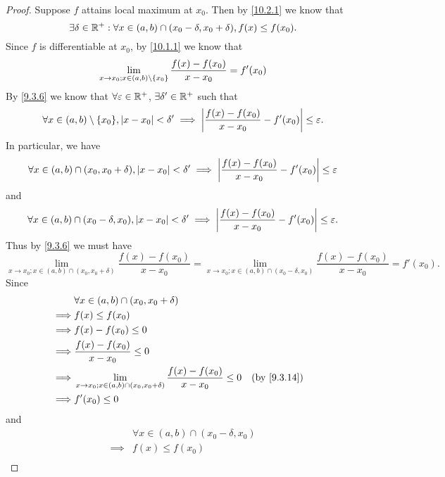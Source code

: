 \begin{proof}
  Suppose \(f\) attains local maximum at \(x_0\).
  Then by \cref{10.2.1} we know that
  \[
    \exists \delta \in \mathbb{R}^+ : \forall x \in (a, b) \cap (x_0 - \delta, x_0 + \delta), f(x) \leq f(x_0).
  \]
  Since \(f\) is differentiable at \(x_0\), by \cref{10.1.1} we know that
  \[
    \lim_{x \to x_0 ; x \in (a, b) \setminus \left\lbrace x_0\right\rbrace} \dfrac{f(x) - f(x_0)}{x - x_0} = f'(x_0)
  \]
  By \cref{9.3.6} we know that \(\forall \varepsilon \in \mathbb{R}^+\), \(\exists \delta' \in \mathbb{R}^+\) such that
  \[
    \forall x \in (a, b) \setminus \set{x_0}, \abs{x - x_0} < \delta' \implies \abs{\dfrac{f(x) - f(x_0)}{x - x_0} - f'(x_0)} \leq \varepsilon.
  \]
  In particular, we have
  \[
    \forall x \in (a, b) \cap (x_0, x_0 + \delta), \left\lvert x - x_0\right\rvert < \delta' \implies \left\lvert\dfrac{f(x) - f(x_0)}{x - x_0} - f'(x_0)\right\rvert \leq \varepsilon
  \]
  and
  \[
    \forall x \in (a, b) \cap (x_0 - \delta, x_0), \left\lvert x - x_0\right\rvert < \delta' \implies \left\lvert\dfrac{f(x) - f(x_0)}{x - x_0} - f'(x_0)\right\rvert \leq \varepsilon.
  \]
  Thus by \cref{9.3.6} we must have
  \[
    \lim_{x \to x_0 ; x \in (a, b) \cap (x_0, x_0 + \delta)} \dfrac{f(x) - f(x_0)}{x - x_0} = \lim_{x \to x_0 ; x \in (a, b) \cap (x_0 - \delta, x_0)} \dfrac{f(x) - f(x_0)}{x - x_0} = f'(x_0).
  \]
  Since
  \begin{align*}
             & \forall x \in (a, b) \cap (x_0, x_0 + \delta)                                                                   \\
    \implies & f(x) \leq f(x_0)                                                                                                \\
    \implies & f(x) - f(x_0) \leq 0                                                                                            \\
    \implies & \dfrac{f(x) - f(x_0)}{x - x_0} \leq 0                                                                           \\
    \implies & \lim_{x \to x_0 ; x \in (a, b) \cap (x_0, x_0 + \delta)} \dfrac{f(x) - f(x_0)}{x - x_0} \leq 0 &  & \by{9.3.14} \\
    \implies & f'(x_0) \leq 0
  \end{align*}
  and
  \begin{align*}
             & \forall x \in (a, b) \cap (x_0 - \delta, x_0)                                                                    \\
    \implies & f(x) \leq f(x_0)                                                                                                 \\

\end{align*}
\end{proof}
